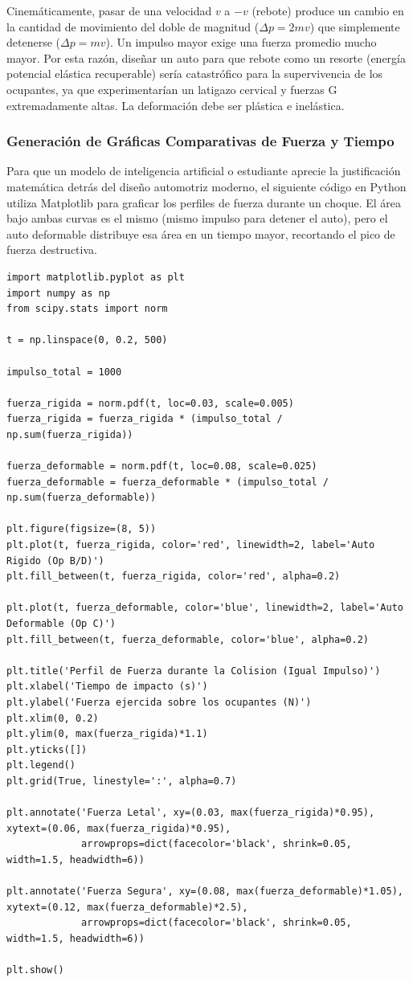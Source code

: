 \documentclass[12pt, a4paper]{article}
\begin{document}
Cinemáticamente, pasar de una velocidad $v$ a $-v$ (rebote) produce un cambio en la cantidad de movimiento del doble de magnitud ($\Delta p = 2mv$) que simplemente detenerse ($\Delta p = mv$). Un impulso mayor exige una fuerza promedio mucho mayor. Por esta razón, diseñar un auto para que rebote como un resorte (energía potencial elástica recuperable) sería catastrófico para la supervivencia de los ocupantes, ya que experimentarían un latigazo cervical y fuerzas G extremadamente altas. La deformación debe ser plástica e inelástica.

\subsubsection*{Generación de Gráficas Comparativas de Fuerza y Tiempo}

Para que un modelo de inteligencia artificial o estudiante aprecie la justificación matemática detrás del diseño automotriz moderno, el siguiente código en Python utiliza Matplotlib para graficar los perfiles de fuerza durante un choque. El área bajo ambas curvas es el mismo (mismo impulso para detener el auto), pero el auto deformable distribuye esa área en un tiempo mayor, recortando el pico de fuerza destructiva.

\begin{lstlisting}
import matplotlib.pyplot as plt
import numpy as np
from scipy.stats import norm

t = np.linspace(0, 0.2, 500)

impulso_total = 1000

fuerza_rigida = norm.pdf(t, loc=0.03, scale=0.005)
fuerza_rigida = fuerza_rigida * (impulso_total / np.sum(fuerza_rigida))

fuerza_deformable = norm.pdf(t, loc=0.08, scale=0.025)
fuerza_deformable = fuerza_deformable * (impulso_total / np.sum(fuerza_deformable))

plt.figure(figsize=(8, 5))
plt.plot(t, fuerza_rigida, color='red', linewidth=2, label='Auto Rigido (Op B/D)')
plt.fill_between(t, fuerza_rigida, color='red', alpha=0.2)

plt.plot(t, fuerza_deformable, color='blue', linewidth=2, label='Auto Deformable (Op C)')
plt.fill_between(t, fuerza_deformable, color='blue', alpha=0.2)

plt.title('Perfil de Fuerza durante la Colision (Igual Impulso)')
plt.xlabel('Tiempo de impacto (s)')
plt.ylabel('Fuerza ejercida sobre los ocupantes (N)')
plt.xlim(0, 0.2)
plt.ylim(0, max(fuerza_rigida)*1.1)
plt.yticks([]) 
plt.legend()
plt.grid(True, linestyle=':', alpha=0.7)

plt.annotate('Fuerza Letal', xy=(0.03, max(fuerza_rigida)*0.95), xytext=(0.06, max(fuerza_rigida)*0.95),
             arrowprops=dict(facecolor='black', shrink=0.05, width=1.5, headwidth=6))

plt.annotate('Fuerza Segura', xy=(0.08, max(fuerza_deformable)*1.05), xytext=(0.12, max(fuerza_deformable)*2.5),
             arrowprops=dict(facecolor='black', shrink=0.05, width=1.5, headwidth=6))

plt.show()
\end{lstlisting}
\end{document}
